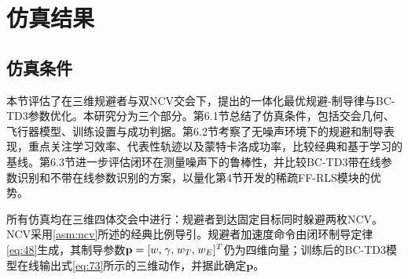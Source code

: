 %
%
%
\section{仿真结果}
\subsection{仿真条件}
本节评估了在三维规避者与双NCV交会下，提出的一体化最优规避-制导律与BC-TD3参数优化。本研究分为三个部分。第6.1节总结了仿真条件，包括交会几何、飞行器模型、训练设置与成功判据。第6.2节考察了无噪声环境下的规避和制导表现，重点关注学习效率、代表性轨迹以及蒙特卡洛成功率，比较经典和基于学习的基线。第6.3节进一步评估闭环在测量噪声下的鲁棒性，并比较BC-TD3带在线参数识别和不带在线参数识别的方案，以量化第4节开发的稀疏FF-RLS模块的优势。

所有仿真均在三维四体交会中进行：规避者到达固定目标同时躲避两枚NCV。NCV采用\cref{asm:ncv}所述的经典比例导引。规避者加速度命令由闭环制导定律\eqref{eq:48}生成，其制导参数${\mathbf{p}} = {[w,{\kern 1pt} \gamma ,{\kern 1pt} {w_T},{\kern 1pt} {w_E}]^T}$仍为四维向量；训练后的BC-TD3模型在线输出式\eqref{eq:73}所示的三维动作，并据此确定${\mathbf{p}}$。

